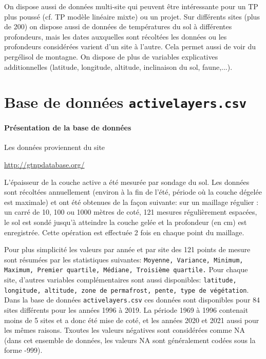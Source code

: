 \documentclass[a4paper,12pt]{article}
\theoremstyle{exercice}
\begin{document}
	On dispose aussi de données multi-site qui peuvent être intéressante pour un TP plus poussé (cf. TP modèle linéaire mixte) ou un projet. Sur différents sites (plus de 200) on dispose aussi de données de températures du sol à différentes profondeurs, mais les dates auxquelles sont récoltées les données ou les profondeurs considérées varient d'un site à l'autre.  Cela permet aussi de voir du pergélisol de montagne.
		On dispose de plus 	de variables explicatives additionnelles (latitude, longitude, altitude, inclinaison du sol, faune,...).
	
	
	
	\newpage

\section{Base de données  \texttt{activelayers.csv}}
\paragraph{Présentation de la base de données} Les données proviennent du site 

\begin{center}\url{http://gtnpdatabase.org/}\end{center}




L'épaisseur  de la couche active a été mesurée par sondage du sol. Les  données sont récoltées annuellement (environ à la fin de l'été, période où la couche dégelée est maximale) et ont été obtenues de la fa\c con suivante: sur un maillage régulier : un carré de 10, 100 ou 1000 mètres de coté,  121 mesures régulièrement espacées, le sol est sondé jusqu'à atteindre la couche gelée et la profondeur (en cm) est enregistrée. Cette opération est effectuée 2 fois en chaque point du maillage.

Pour plus simplicité les valeurs par année et par site des 121 points de mesure sont résumées par les statistiques suivantes:
 \texttt{Moyenne,
 Variance,
 Minimum,
 Maximum,
 Premier quartile,
 Médiane,
 Troisième quartile.}
Pour chaque site, d'autres variables complémentaires sont aussi disponibles:
 \texttt{latitude, longitude, altitude, zone de permafrost, pente, type de végétation}.\\


 Dans la base de données \texttt{activelayers.csv} ces données sont disponibles pour 84 sites différents pour les années 1996 à 2019. La période 1969 à 1996 contenait moins de 5 sites et a donc été mise de coté, et les années 2020 et 2021 aussi pour les mêmes raisons. Txoutes les valeurs négatives sont considérées comme NA (dans cet ensemble de données, les valeurs NA sont généralement codées sous la forme -999).
 
 
 

	
\end{document}

